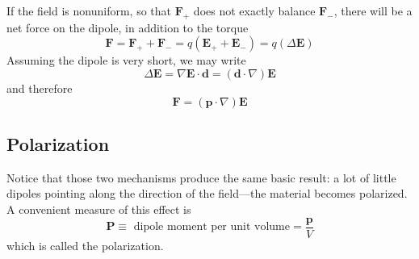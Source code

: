 \documentclass[../../../main.tex]{subfiles}
\begin{document}
If the field is nonuniform, so that $\mathbf{F}_+$ does not exactly balance $\mathbf{F}_-$, there will be
a net force on the dipole, in addition to the torque
\begin{equation*}
    \mathbf{F} = \mathbf{F}_+ + \mathbf{F}_- = q(\mathbf{E}_++ \mathbf{E}_-) = q(\Delta \mathbf{E})
\end{equation*}
Assuming the dipole is very short, we may write
\begin{equation*}
    \Delta \mathbf{E}=\nabla  \mathbf{E}\cdot \mathbf{d}=(\mathbf{d}\cdot\nabla) \mathbf{E}
\end{equation*}
and therefore
\begin{equation*}
    \mathbf{F} = (\mathbf{p}\cdot\nabla) \mathbf{E}
\end{equation*}

\subsection*{Polarization}
Notice that those two mechanisms produce the same basic result: a lot of little dipoles pointing along the direction of the field—the material becomes polarized. A convenient measure of this effect is
\begin{equation*}
    \mathbf{P}\equiv\text{ dipole moment per unit volume}=\frac{\mathbf{p}}{V}
\end{equation*}
which is called the polarization. 
\end{document}
